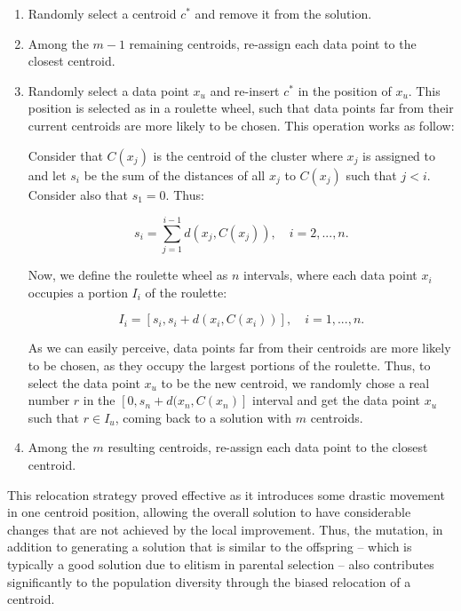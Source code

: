 \begin{enumerate}

	\item Randomly select a centroid $c^{*}$ and remove it from the solution.
	
	\item Among the $m-1$ remaining centroids, re-assign each data point to the closest centroid.
	
	\item Randomly select a data point $x_u$ and re-insert $c^{*}$ in the position of $x_u$. This position is selected as in a roulette wheel, such that data points far from their current centroids are more likely to be chosen. This operation works as follow:
	
	Consider that $C(x_j)$ is the centroid of the cluster where $x_j$ is assigned to and let $s_i$ be the sum of the distances of all $x_j$ to $C(x_j)$ such that $j < i$. Consider also that $s_1 = 0$. Thus:
	
	\begin{equation}
	s_i = \sum_{j=1}^{i-1} d(x_j, C(x_j)), \quad i = 2, ..., n.
	\end{equation}
	
	Now, we define the roulette wheel as $n$ intervals, where each data point $x_i$ occupies a portion $I_i$ of the roulette:
	
	\begin{equation}
	I_i = [ s_i, s_i + d(x_i, C(x_i)) ], \quad i = 1, ..., n.
	\end{equation}
	
	As we can easily perceive, data points far from their centroids are more likely to be chosen, as they occupy the largest portions of the roulette. Thus, to select the data point $x_u$ to be the new centroid, we randomly chose a real number $r$ in the $[ 0, s_n + d(x_n, C(x_n) ]$ interval and get the data point $x_u$ such that $r \in I_u$, coming back to a solution with $m$ centroids.
	
	\item Among the $m$ resulting centroids, re-assign each data point to the closest centroid.
		
\end{enumerate}

This relocation strategy proved effective as it introduces some drastic movement in one centroid position, allowing the overall solution to have considerable changes that are not achieved by the local improvement. Thus, the mutation, in addition to generating a solution that is similar to the offspring -- which is typically a good solution due to elitism in parental selection -- also contributes significantly to the population diversity through the biased relocation of a centroid.

